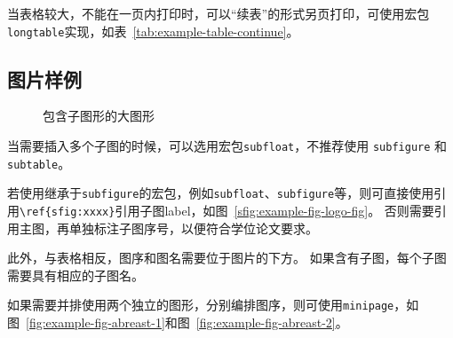 当表格较大，不能在一页内打印时，可以“续表”的形式另页打印，可使用宏包\verb|longtable|实现，如表~\ref{tab:example-table-continue}。


\subsection{图片样例}
\label{sec:figure-example}

\begin{figure}[htb]
  \centering
  \hspace{4em}
  \caption{包含子图形的大图形}
  \label{fig:example-fig-subfloat}
\end{figure}

当需要插入多个子图的时候，可以选用宏包\verb|subfloat|，不推荐使用
\verb|subfigure| 和 \verb|subtable|。

若使用继承于\verb|subfigure|的宏包，例如\verb|subfloat|、\verb|subfigure|等，则可直接使用引用\verb|\ref{sfig:xxxx}|引用子图label，如图~\ref{sfig:example-fig-logo-fig}。
否则需要引用主图，再单独标注子图序号，以便符合学位论文要求。

此外，与表格相反，图序和图名需要位于图片的下方。
如果含有子图，每个子图需要具有相应的子图名。


如果需要并排使用两个独立的图形，分别编排图序，则可使用\verb|minipage|，如图~\ref{fig:example-fig-abreast-1}和图~\ref{fig:example-fig-abreast-2}。


